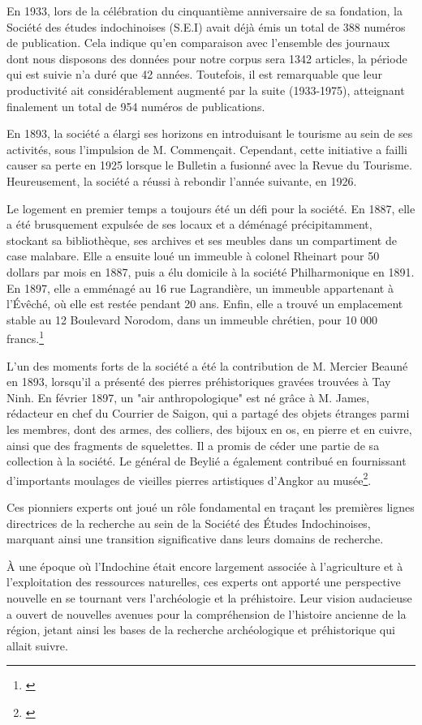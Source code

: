 En 1933, lors de la célébration du cinquantième anniversaire de sa fondation, la Société des études indochinoises (S.E.I) avait déjà émis un total de 388 numéros de publication. Cela indique qu'en comparaison avec l'ensemble des journaux dont nous disposons des données pour notre corpus sera 1342 articles, la période qui est suivie n'a duré que 42 années. Toutefois, il est remarquable que leur productivité ait considérablement augmenté par la suite (1933-1975), atteignant finalement un total de 954 numéros de publications.

En 1893, la société a élargi ses horizons en introduisant le tourisme au sein de ses activités, sous l'impulsion de M. Commençait. Cependant, cette initiative a failli causer sa perte en 1925 lorsque le Bulletin a fusionné avec la Revue du Tourisme. Heureusement, la société a réussi à rebondir l'année suivante, en 1926.

Le logement en premier temps a toujours été un défi pour la société. En 1887, elle a été brusquement expulsée de ses locaux et a déménagé précipitamment, stockant sa bibliothèque, ses archives et ses meubles dans un compartiment de case malabare. Elle a ensuite loué un immeuble à colonel Rheinart pour 50 dollars par mois en 1887, puis a élu domicile à la société Philharmonique en 1891. En 1897, elle a emménagé au 16 rue Lagrandière, un immeuble appartenant à l'Évêché, où elle est restée pendant 20 ans. Enfin, elle a trouvé un emplacement stable au 12 Boulevard Norodom, dans un immeuble chrétien, pour 10 000 francs.\footnote{\cite{societe}}

L'un des moments forts de la société a été la contribution de M. Mercier Beauné en 1893, lorsqu'il a présenté des pierres préhistoriques gravées trouvées à Tay Ninh. En février 1897, un "air anthropologique" est né grâce à M. James, rédacteur en chef du Courrier de Saigon, qui a partagé des objets étranges parmi les membres, dont des armes, des colliers, des bijoux en os, en pierre et en cuivre, ainsi que des fragments de squelettes. Il a promis de céder une partie de sa collection à la société. Le général de Beylié a également contribué en fournissant d'importants moulages de vieilles pierres artistiques d'Angkor au musée\footnote{\cite{societe}}. 

Ces pionniers experts ont joué un rôle fondamental en traçant les premières lignes directrices de la recherche au sein de la Société des Études Indochinoises, marquant ainsi une transition significative dans leurs domains de recherche.

À une époque où l'Indochine était encore largement associée à l'agriculture et à l'exploitation des ressources naturelles, ces experts ont apporté une perspective nouvelle en se tournant vers l'archéologie et la préhistoire. Leur vision audacieuse a ouvert de nouvelles avenues pour la compréhension de l'histoire ancienne de la région, jetant ainsi les bases de la recherche archéologique et préhistorique qui allait suivre.

